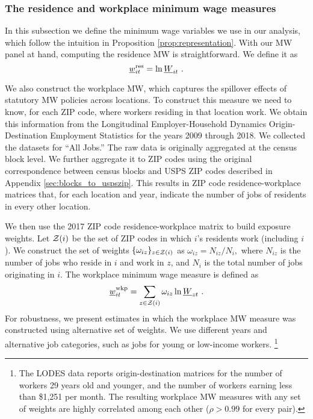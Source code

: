 
\subsubsection{The residence and workplace minimum wage measures}
\label{sec:data_mw_measures}

In this subsection we define the minimum wage variables we use in our analysis,
which follow the intuition in Proposition \ref{prop:representation}.
With our MW panel at hand, computing the residence MW is straightforward.
We define it as
\begin{equation*}
    \underline{w}^{\text{res}}_{it} = \ln \underline{W}_{it} \ .
\end{equation*}

We also construct the workplace MW, which captures the spillover effects of
statutory MW policies across locations.
To construct this measure we need to know, for each ZIP code, where workers 
residing in that location work.
We obtain this information from the Longitudinal Employer-Household 
Dynamics Origin-Destination Employment Statistics \parencite[LODES;][]{CensusLODES}
for the years 2009 through 2018.
We collected the datasets for ``All Jobs.''
The raw data is originally aggregated at the census block level. 
We further aggregate it to ZIP codes using the original correspondence between 
census blocks and USPS ZIP codes described in Appendix 
\ref{sec:blocks_to_uspszip}.
This results in ZIP code residence-workplace matrices that, for each location 
and year, indicate the number of jobs of residents in every other location.

We then use the 2017 ZIP code residence-workplace matrix to build exposure 
weights.
Let $\mathcal{Z}(i)$ be the set of ZIP codes in which $i$'s residents work 
(including $i$).
We construct the set of weights $\{\omega_{iz}\}_{z\in\mathcal{Z}(i)}$ as 
$ \omega_{iz} = N_{iz}/{N_i} , $
where 
$N_{iz}$ is the number of jobs who reside in $i$ and work in $z$, 
and $N_i$ is the total number of jobs originating in $i$.
The workplace minimum wage measure is defined as
\begin{equation*}\label{eq:mw_wkp_definition}
    \mw^{\wkp}_{it} = \sum_{z\in\Z(i)} \omega_{iz} \ln \MW_{zt} \ .
\end{equation*}
For robustness, we present estimates in which the workplace MW measure
was constructed using alternative set of weights.
We use different years and alternative job categories,
such as jobs for young or low-income workers.%
\footnote{The LODES data reports origin-destination matrices for the 
number of workers 29 years old and younger, and the number of workers 
earning less than \$1,251 per month.
The resulting workplace MW measures with any set of weights are highly correlated 
among each other ($\rho>0.99$ for every pair).}

